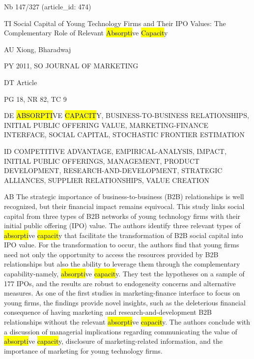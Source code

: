 \documentclass[a4paper]{article}
\begin{document}
\vspace*{-2cm}
Nb \tabto{0cm}147/327 (article\_id: 474)\par
TI \tabto{0cm}Social Capital of Young Technology Firms and Their IPO Values: The Complementary Role of Relevant \hl{Absorpti}ve \hl{Capacit}y\par
AU \tabto{0cm}Xiong, Bharadwaj\par
PY \tabto{0cm}2011, SO JOURNAL OF MARKETING\par
DT \tabto{0cm}Article\par
PG \tabto{0cm}18, NR 82, TC 9\par
DE \tabto{0cm}\hl{ABSORPTI}VE \hl{CAPACIT}Y, BUSINESS-TO-BUSINESS RELATIONSHIPS, INITIAL PUBLIC OFFERING VALUE, MARKETING-FINANCE INTERFACE, SOCIAL CAPITAL, STOCHASTIC FRONTIER ESTIMATION\par
ID \tabto{0cm}COMPETITIVE ADVANTAGE, EMPIRICAL-ANALYSIS, IMPACT, INITIAL PUBLIC OFFERINGS, MANAGEMENT, PRODUCT DEVELOPMENT, RESEARCH-AND-DEVELOPMENT, STRATEGIC ALLIANCES, SUPPLIER RELATIONSHIPS, VALUE CREATION\par
AB \tabto{0cm}The strategic importance of business-to-business (B2B) relationships is well recognized, but their financial impact remains equivocal. This study links social capital from three types of B2B networks of young technology firms with their initial public offering (IPO) value. The authors identify three relevant types of \hl{absorpti}ve \hl{capacit}y that facilitate the transformation of B2B social capital into IPO value. For the transformation to occur, the authors find that young firms need not only the opportunity to access the resources provided by B2B relationships but also the ability to leverage them through the complementary capability-namely, \hl{absorpti}ve \hl{capacit}y. They test the hypotheses on a sample of 177 IPOs, and the results are robust to endogeneity concerns and alternative measures. As one of the first studies in marketing-finance interface to focus on young firms, the findings provide novel insights, such as the deleterious financial consequence of having marketing and research-and-development B2B relationships without the relevant \hl{absorpti}ve \hl{capacit}y. The authors conclude with a discussion of managerial implications regarding communicating the value of \hl{absorpti}ve \hl{capacit}y, disclosure of marketing-related information, and the importance of marketing for young technology firms.\par
\clearpage
\end{document}
